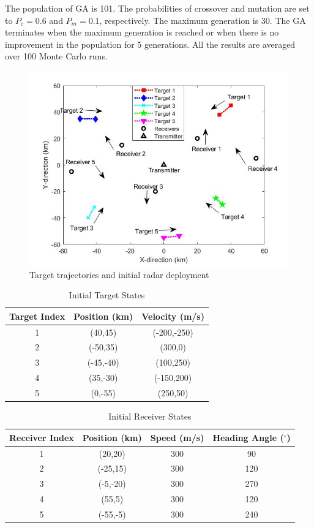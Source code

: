 \documentclass[12pt,journal,draftclsnofoot,onecolumn]{IEEEtran}
\begin{document}
The population of GA is 101. The probabilities of crossover and mutation are set to $P_c=0.6$ and $P_m=0.1$, respectively. The maximum generation is 30. The GA terminates when the maximum generation is reached or when there is no improvement in the population for 5 generations. All the results are averaged over 100 Monte Carlo runs.

\begin{figure}
	\centering
	\includegraphics[scale=0.36]{Initial State.jpg}
	\caption{Target trajectories and initial radar deployment}
	\label{fig:pd}
\end{figure}

 \begin{table}
	\centering
	\caption{Initial Target States}
	\begin{tabular}{ccc}
		\toprule
		Target Index & Position (km) & Velocity (m/s)\\ \midrule
		1 & (40,45) & (-200,-250)\\ 
		2 & (-50,35) & (300,0)\\ 
		3 & (-45,-40) & (100,250)\\ 
		4 & (35,-30) & (-150,200)\\ 
		5 & (0,-55) & (250,50)\\ 
		\bottomrule
	\end{tabular}
\label{tab:Target State}
\end{table} 

 \begin{table}[H]
	\centering
	\caption{Initial Receiver States}
	\begin{tabular}{cccc}
		\toprule
		Receiver Index & Position (km) & Speed (m/s) & Heading Angle ($^\circ$)\\ \midrule
		1 & (20,20) & 300 & 90\\ 
		2 & (-25,15) & 300 & 120\\ 
		3 & (-5,-20) & 300 & 270\\ 
		4 & (55,5) & 300 & 120\\ 
		5 & (-55,-5) & 300 & 240\\ 
		\bottomrule
	\end{tabular}
\label{tab:Receiver State}
\end{table}
\end{document}
